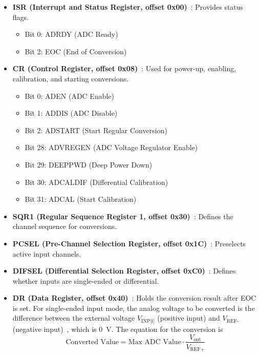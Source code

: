 \documentclass[12pt,a4paper]{article}
\begin{document}
\begin{itemize}
    \item \textbf{ISR (Interrupt and Status Register, offset 0x00)}~\cite[pp.~996]{ref-manual}: Provides status flags.
        \begin{itemize}
            \item Bit 0: ADRDY (ADC Ready)
            \item Bit 2: EOC (End of Conversion)
        \end{itemize}
    \item \textbf{CR (Control Register, offset 0x08)}~\cite[pp.~1001]{ref-manual}: Used for power-up, enabling, calibration, and starting conversions.
        \begin{itemize}
            \item Bit 0: ADEN (ADC Enable)
            \item Bit 1: ADDIS (ADC Disable)
            \item Bit 2: ADSTART (Start Regular Conversion)
            \item Bit 28: ADVREGEN (ADC Voltage Regulator Enable)
            \item Bit 29: DEEPPWD (Deep Power Down)
            \item Bit 30: ADCALDIF (Differential Calibration)
            \item Bit 31: ADCAL (Start Calibration)
        \end{itemize}
    \item \textbf{SQR1 (Regular Sequence Register 1, offset 0x30)}~\cite[pp.~1020]{ref-manual}: Defines the channel sequence for conversions.
    \item \textbf{PCSEL (Pre-Channel Selection Register, offset 0x1C)}~\cite[pp.~1018]{ref-manual}: Preselects active input channels.
    \item \textbf{DIFSEL (Differential Selection Register, offset 0xC0)}~\cite[pp.~1031]{ref-manual}: Defines whether inputs are single-ended or differential.
    \item \textbf{DR (Data Register, offset 0x40)}~\cite[pp.~1024]{ref-manual}: Holds the conversion result after EOC is set. For single-ended input mode, the analog voltage to be converted is the
difference between the external voltage $V_{\text{INP[i]}}$ (positive input) and $V_\text{REF-}$ (negative input)~\cite[pp.~924]{ref-manual}, which is \SI{0}{\volt}. The equation for the conversion is
    \begin{equation}
    \label{eq: adc}
        \text{Converted Value} = \text{Max ADC Value} \cdot \frac{V_{\text{out}}}{V_{\text{REF+}}}
    \end{equation}
\end{itemize}
\end{document}
